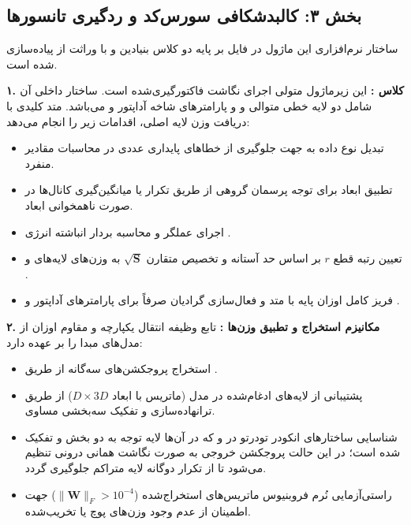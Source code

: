 \subsection*{بخش ۳: کالبدشکافی سورس‌کد و ردگیری تانسورها }
ساختار نرم‌افزاری این ماژول در فایل  بر پایه دو کلاس بنیادین  و  با وراثت از  پیاده‌سازی شده است.

\textbf{۱. کلاس :}
این زیرماژول متولی اجرای نگاشت فاکتورگیری‌شده است. ساختار داخلی آن شامل دو لایه خطی متوالی  و  و پارامترهای شاخه آداپتور  و  می‌باشد. متد کلیدی  با دریافت وزن لایه اصلی، اقدامات زیر را انجام می‌دهد:
\begin{itemize}
    \item تبدیل نوع داده به  جهت جلوگیری از خطاهای پایداری عددی در محاسبات مقادیر منفرد.
    \item تطبیق ابعاد برای توجه پرسمان گروهی  از طریق تکرار  یا میانگین‌گیری  کانال‌ها در صورت ناهمخوانی ابعاد.
    \item اجرای عملگر  و محاسبه بردار انباشته انرژی .
    \item تعیین رتبه قطع $r$ بر اساس حد آستانه  و تخصیص متقارن $\sqrt{\mathbf{S}}$ به وزن‌های لایه‌های  و .
    \item فریز کامل اوزان پایه با متد  و فعال‌سازی گرادیان صرفاً برای پارامترهای آداپتور  و .
\end{itemize}

\textbf{۲. مکانیزم استخراج و تطبیق وزن‌ها :}
تابع  وظیفه انتقال یکپارچه و مقاوم اوزان از مدل‌های مبدا را بر عهده دارد:
\begin{itemize}
    \item استخراج پروجکشن‌های سه‌گانه از طریق .
    \item پشتیبانی از لایه‌های ادغام‌شده  در مدل  (ماتریس  با ابعاد $D \times 3D$) از طریق ترانهاده‌سازی و تفکیک سه‌بخشی مساوی.
    \item شناسایی ساختارهای انکودر تودرتو  در  و  که در آن‌ها لایه توجه به دو بخش  و  تفکیک شده است؛ در این حالت پروجکشن خروجی به صورت نگاشت همانی درونی تنظیم می‌شود تا از تکرار دوگانه لایه متراکم جلوگیری گردد.
    \item راستی‌آزمایی نُرم فروبنیوس ماتریس‌های استخراج‌شده ($\|\mathbf{W}\|_F > 10^{-4}$) جهت اطمینان از عدم وجود وزن‌های پوچ یا تخریب‌شده.
\end{itemize}

